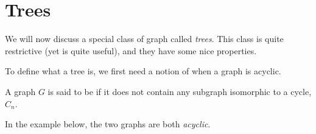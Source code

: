 \documentclass[a4paper]{scrreprt}
\begin{document}
\section{Trees}

We will now discuss a special class of graph called \emph{trees}.
This class is quite restrictive (yet is quite useful), and they have some nice properties.

To define what a tree is, we first need a notion of when a graph is acyclic.

\begin{definition}[Acyclic]
	A graph $G$ is said to be  if it does not contain any subgraph isomorphic to a cycle, $C_n$.
\end{definition}

\begin{example}
	In the example below, the two graphs are both \emph{acyclic}.
	\begin{center}



		\begin{tikzpicture}[x=0.75pt,y=0.75pt,yscale=-1,xscale=1]
		

\end{tikzpicture}
\end{center}
\end{example}
\end{document}
